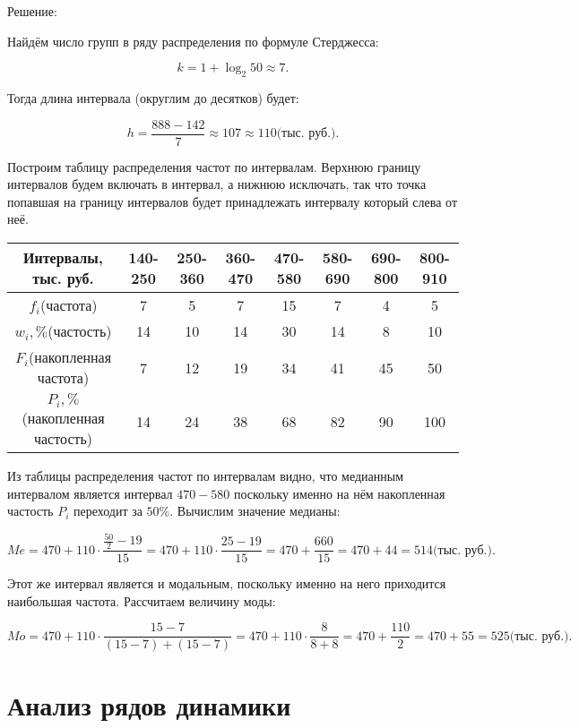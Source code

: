 \documentclass[fleqn]{article}
\begin{document}
\begin{center}Решение:\end{center}

Найдём число групп в ряду распределения по формуле Стерджесса:

$$k=1+\log_2{50}\approx7.$$

Тогда длина интервала (округлим до десятков) будет:

$$h=\frac{888-142}{7}\approx107\approx110\textit{(тыс. руб.)}.$$

Построим таблицу распределения частот по интервалам. Верхнюю границу интервалов будем включать в интервал, а нижнюю исключать, так что точка попавшая на границу интервалов будет принадлежать интервалу который слева от неё.

\bgroup
\def\arraystretch{1.5}
\setlength{}

\begin{center}
\begin{tabular}{|c|c|c|c|c|c|c|c|}
\hline
Интервалы, тыс. руб. & 140-250 & 250-360 & 360-470 & 470-580 & 580-690 & 690-800 & 800-910 \\
\hline
$f_i$(частота) & 7 & 5 & 7 & 15 & 7 & 4 & 5 \\
\hline
$w_i,\%$(частость) & 14 & 10 & 14 & 30 & 14 & 8 & 10 \\
\hline
$F_i$(накопленная частота) & 7 & 12 & 19 & 34 & 41 & 45 & 50 \\
\hline
$P_i,\%$(накопленная частость) & 14 & 24 & 38 & 68 & 82 & 90 & 100 \\
\hline
\end{tabular}
\end{center}
\egroup

Из таблицы распределения частот по интервалам видно, что медианным интервалом является интервал $470-580$ поскольку именно на нём накопленная частость $P_i$ переходит за $50\%$. Вычислим значение медианы:

$$Me=470+110\cdot\frac{\frac{50}{2}-19}{15}=470+110\cdot\frac{25-19}{15}=470+\frac{660}{15}=470+44=514\textit{(тыс. руб.)}.$$

Этот же интервал является и модальным, поскольку именно на него приходится наибольшая частота. Рассчитаем величину моды:

$$Mo=470+110\cdot\frac{15-7}{(15-7)+(15-7)}=470+110\cdot\frac{8}{8+8}=470+\frac{110}{2}=470+55=525\textit{(тыс. руб.)}.$$


\bigskip

\section*{Анализ рядов динамики}
\end{document}

